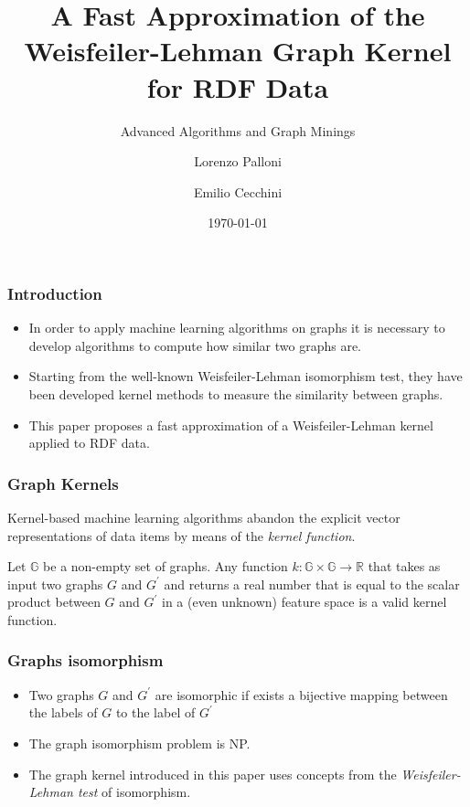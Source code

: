 \documentclass{beamer}
\title[A Fast Approximation of WL RDF kernel]{A Fast Approximation of the Weisfeiler-Lehman Graph Kernel for RDF Data}
\subtitle{Advanced Algorithms and Graph Minings}
\author{Lorenzo Palloni \and Emilio Cecchini}
\institute[]{
    Università Degli Studi di Firenze \\
    \medskip
    \textit{lorenzo.palloni@stud.unifi.it \and emilio.cecchini@stud.unifi.it}
}
\date{\today}
\begin{document}
\begin{frame}
\titlepage %
\end{frame}


\begin{frame}
\frametitle{Introduction}

\begin{itemize}
\item
In order to apply machine learning algorithms on graphs it is necessary to develop algorithms to compute how similar two graphs are.

\item
Starting from the well-known Weisfeiler-Lehman isomorphism test, they have been developed kernel methods to measure the similarity between graphs.

\item
This paper proposes a fast approximation of a Weisfeiler-Lehman kernel applied to RDF data.


\end{itemize}

\end{frame}

\begin{frame}
\frametitle{Graph Kernels}

Kernel-based machine learning algorithms abandon the explicit vector representations of data items by means of the \textit{kernel function}.

\begin{definition}
Let $\mathbb{G}$ be a non-empty set of graphs. Any function $k: \mathbb{G} \times \mathbb{G} \rightarrow \mathbb{R}$ that takes as input two graphs $G$ and $G^\prime$ and returns a real number that is equal to the scalar product between $G$ and $G^\prime$ in a (even unknown) feature space is a valid kernel function.
\end{definition}

\end{frame}


\begin{frame}
\frametitle{Graphs isomorphism}

\begin{itemize}
\item
Two graphs $G$ and $G^\prime$ are isomorphic if exists a bijective mapping between the labels of $G$ to the label of $G^\prime$

\item
The graph isomorphism problem is NP.

\item
The graph kernel introduced in this paper uses concepts from the \textit{Weisfeiler-Lehman test} of isomorphism.
\end{itemize}

\end{frame}
\end{document}
